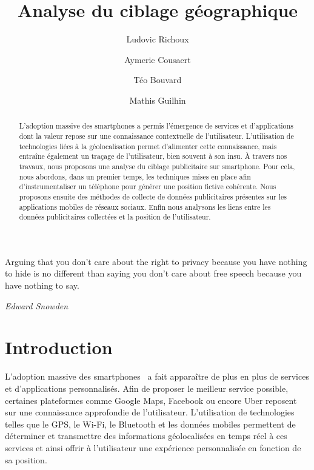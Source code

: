 \documentclass[runningheads]{llncs}
\begin{document}
\title{Analyse du ciblage géographique} 

\author{
    Ludovic Richoux \and
    Aymeric Cousaert \and
    Téo Bouvard \and 
    Mathis Guilhin
}

%


\maketitle

\epigraph{
    Arguing that you don't care about the right to privacy because you have nothing to hide is no different than saying you don't care about free speech because you have nothing to say. \cite{edward_snowden_riama_2015}}{\textit{Edward Snowden}
}

\begin{abstract}

L'adoption massive des smartphones a permis l'émergence de services et d'applications dont la valeur repose sur une connaissance contextuelle de l'utilisateur. L'utilisation de technologies liées à la géolocalisation permet d'alimenter cette connaissance, mais entraîne également un traçage de l'utilisateur, bien souvent à son insu. À travers nos travaux, nous proposons une analyse du ciblage publicitaire sur smartphone. Pour cela, nous abordons, dans un premier temps, les techniques mises en place afin d'instrumentaliser un téléphone pour générer une position fictive cohérente. Nous proposons ensuite des méthodes de collecte de données publicitaires présentes sur les applications mobiles de réseaux sociaux. Enfin nous analysons les liens entre les données publicitaires collectées et la position de l'utilisateur. 



\end{abstract}

\section{Introduction}

L'adoption massive des smartphones~\cite{pew_research_center_demographics_2019} a fait apparaître de plus en plus de services et d'applications personnalisés. Afin de proposer le meilleur service possible, certaines plateformes comme Google Maps, Facebook ou encore Uber reposent sur une connaissance approfondie de l'utilisateur. L'utilisation de technologies telles que le GPS, le Wi-Fi, le Bluetooth et les données mobiles permettent de déterminer et transmettre des informations géolocalisées en temps réel à ces services et ainsi offrir à l'utilisateur une expérience personnalisée en fonction de sa position. %
\end{document}
